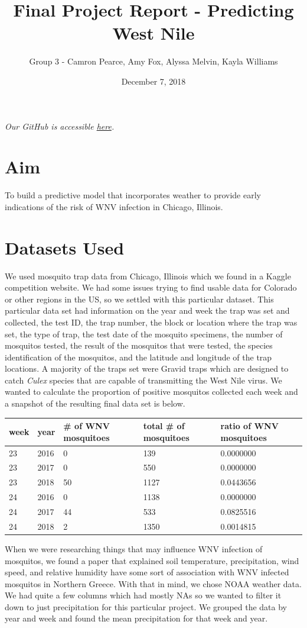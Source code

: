 \documentclass[]{article}
\title{Final Project Report - Predicting West Nile}
\author{Group 3 - Camron Pearce, Amy Fox, Alyssa Melvin, Kayla Williams}
\date{December 7, 2018}
\begin{document}
\maketitle

\emph{Our GitHub is accessible
\href{https://github.com/camronp/predicting_wn}{here}.}

\hypertarget{aim}{%
\section{Aim}\label{aim}}

To build a predictive model that incorporates weather to provide early
indications of the risk of WNV infection in Chicago, Illinois.

\hypertarget{datasets-used}{%
\section{Datasets Used}\label{datasets-used}}

We used mosquito trap data from Chicago, Illinois which we found in a
Kaggle competition website. We had some issues trying to find usable
data for Colorado or other regions in the US, so we settled with this
particular dataset. This particular data set had information on the year
and week the trap was set and collected, the test ID, the trap number,
the block or location where the trap was set, the type of trap, the test
date of the mosquito specimens, the number of mosquitos tested, the
result of the mosquitos that were tested, the species identification of
the mosquitos, and the latitude and longitude of the trap locations. A
majority of the traps set were Gravid traps which are designed to catch
\emph{Culex} species that are capable of transmitting the West Nile
virus. We wanted to calculate the proportion of positive mosquitos
collected each week and a snapshot of the resulting final data set is
below.

\begin{longtable}[]{@{}lllll@{}}
\toprule
week & year & \# of WNV mosquitoes & total \# of mosquitoes & ratio of
WNV mosquitoes\tabularnewline
\midrule
\endhead
23 & 2016 & 0 & 139 & 0.0000000\tabularnewline
23 & 2017 & 0 & 550 & 0.0000000\tabularnewline
23 & 2018 & 50 & 1127 & 0.0443656\tabularnewline
24 & 2016 & 0 & 1138 & 0.0000000\tabularnewline
24 & 2017 & 44 & 533 & 0.0825516\tabularnewline
24 & 2018 & 2 & 1350 & 0.0014815\tabularnewline
\bottomrule
\end{longtable}

When we were researching things that may influence WNV infection of
mosquitos, we found a paper that explained soil temperature,
precipitation, wind speed, and relative humidity have some sort of
association with WNV infected mosquitos in Northern Greece. With that in
mind, we chose NOAA weather data. We had quite a few columns which had
mostly NAs so we wanted to filter it down to just precipitation for this
particular project. We grouped the data by year and week and found the
mean precipitation for that week and year.
\end{document}
